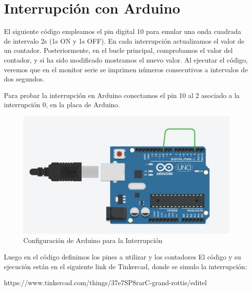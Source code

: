 \documentclass{article}
\begin{document}
\section{Interrupción con Arduino}
El siguiente código empleamos el pin digital 10 para emular una onda cuadrada de intervalo 2s (1s ON y 1s OFF).
En cada interrupción actualizamos el valor de un contador. Posteriormente, en el bucle principal, comprobamos el valor del contador, y si ha sido modificado mostramos el nuevo valor.
Al ejecutar el código, veremos que en el monitor serie se imprimen números consecutivos a intervalos de dos segundos.

Para probar la interrupción en Arduino conectamos el pin 10 al 2 asociado a la interrupción 0, en la placa de Arduino.

\begin{figure}[h]
\centering
\includegraphics[scale=0.7]{interrupcionA}
\caption{Configuración de Arduino para la Interrupción}
\label{fig:interrupcionA}
\end{figure}

Luego en el código definimos los pines a utilizar y los contadores
El código y su ejecución están en el siguiente link de Tinkercad, donde se simulo la interrupción:

https://www.tinkercad.com/things/37e7SP8rarC-grand-rottis/editel 



\end{document}
